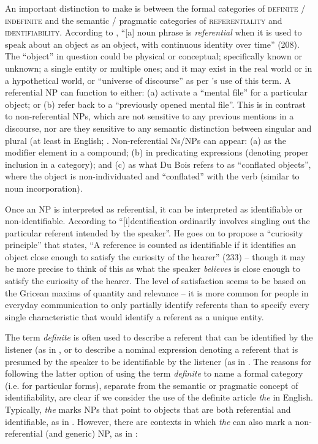 \documentclass[output=paper]{langsci/langscibook}
\begin{document}
An important distinction to make is between the formal categories of \textsc{definite / indefinite} and the semantic / pragmatic categories of \textsc{referentiality} and \textsc{identifiability}. According to \cite{DuBois1980}, “[a] noun phrase is \textit{referential} when it is used to speak about an object as an object, with continuous identity over time” (208). The “object” in question could be physical or conceptual; specifically known or unknown; a single entity or multiple ones; and it may exist in the real world or in a hypothetical world, or “universe of discourse” as per \citet[388]{Givon2001}'s use of this term. A referential NP can function to either: (a) activate a “mental file” for a particular object; or (b) refer back to a “previously opened mental file”. This is in contrast to non-referential NPs, which are not sensitive to any previous mentions in a discourse, nor are they sensitive to any semantic distinction between singular and plural (at least in English; \citealt[210]{DuBois1980}. Non-referential Ns/NPs can appear: (a) as the modifier element in a compound; (b) in predicating expressions (denoting proper inclusion in a category); and (c) as what Du Bois refers to as “conflated objects”, where the object is non-individuated and “conflated” with the verb (similar to noun incorporation).

Once an NP is interpreted as referential, it can be interpreted as identifiable or non-identifiable. According to \citet[232]{DuBois1980} “[i]dentification ordinarily involves singling out the particular referent intended by the speaker”. He goes on to propose a “curiosity principle” that states, “A reference is counted as identifiable if it identifies an object close enough to satisfy the curiosity of the hearer” (233) – though it may be more precise to think of this as what the speaker \textit{believes} is close enough to satisfy the curiosity of the hearer. The level of satisfaction seems to be based on the Gricean maxims of quantity and relevance – it is more common for people in everyday communication to only partially identify referents than to specify every single characteristic that would identify a referent as a unique entity.

The term \textit{definite} is often used to describe a referent that can be identified by the listener (as in \citealt[65]{Comrie1989}, or to describe a nominal expression denoting a referent that is presumed by the speaker to be identifiable by the listener (as in \citealt[79]{Lambrecht1994}. The reasons for following the latter option of using the term \textit{definite} to name a formal category (i.e. for particular forms), separate from the semantic or pragmatic concept of identifiability, are clear if we consider the use of the definite article \textit{the} in English. Typically, \textit{the} marks NPs that point to objects that are both referential and identifiable, as in . However, there are contexts in which \textit{the} can also mark a non-referential (and generic) NP, as in :
\end{document}
